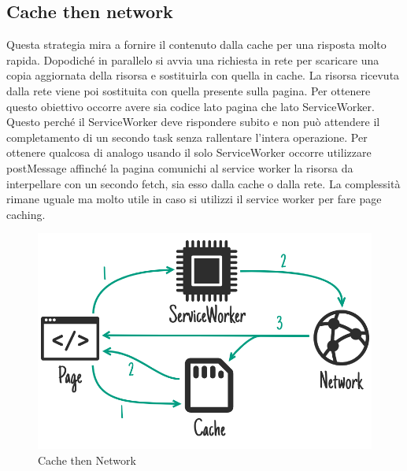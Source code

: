 \documentclass[11pt ,a4paper , twoside , openright ]{article}
\begin{document}
\subsection{Cache then network}
Questa strategia mira a fornire il contenuto dalla cache per una risposta molto rapida. Dopodiché in parallelo si avvia una richiesta in rete per scaricare una copia aggiornata della risorsa e sostituirla con quella in cache. La risorsa ricevuta dalla rete viene poi sostituita con quella presente sulla pagina.
Per ottenere questo obiettivo occorre avere sia codice lato pagina che lato ServiceWorker. Questo perché il ServiceWorker deve rispondere subito e non può attendere il completamento di un secondo task senza rallentare l’intera operazione.
Per ottenere qualcosa di analogo usando il solo ServiceWorker occorre utilizzare postMessage affinché la pagina comunichi al service worker la risorsa da interpellare con un secondo fetch, sia esso dalla cache o dalla rete. La complessità rimane uguale ma molto utile in caso si utilizzi il service worker per fare page caching.

\begin{figure}[h]
	\centering
	\includegraphics[width=1\linewidth]{Strategia6}
	\caption{Cache then Network}
	\label{fig: Cache then Network}
\end{figure}
\newpage
\end{document}
